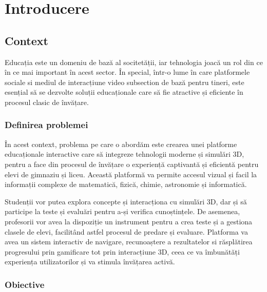 \chapter{Introducere}
\label{chapter:intro}


\section{Context}
\label{sec:proj}
\onehalfspacing
Educația este un domeniu de bază al socitetății, iar tehnologia joacă un rol din ce în ce mai important 
în acest sector. În special, într-o lume în care platformele sociale si mediul de interacțiune video subsection
de bază pentru tineri, este esențial să se dezvolte soluții educaționale care să fie atractive și eficiente în 
procesul clasic de învățare.

\subsection{Definirea problemei}
\label{sub-sec:proj-scope}
\onehalfspacing
În acest context, problema pe care o abordăm este crearea unei platforme educaționale interactive care să integreze
tehnologii moderne și simulări 3D, pentru a face din procesul de învățare o experiență captivantă și eficientă pentru
elevi de gimnaziu și liceu. Această platformă va permite accesul vizual și facil la informații complexe de matematică,
fizică, chimie, astronomie și informatică.

Studenții vor putea explora concepte și interacționa cu simulări 3D, dar și să participe la teste și evaluări
pentru a-și verifica cunoștințele. De asemenea, profesorii vor avea la dispoziție un instrument pentru a crea teste și
a gestiona clasele de elevi, facilitând astfel procesul de predare și evaluare. Platforma va avea un sistem interactiv de 
navigare, recunoaștere a rezultatelor si răsplătirea progresului prin gamificare tot prin interacțiune 3D, ceea ce va
îmbunătăți experiența utilizatorilor și va stimula învățarea activă.


\subsection{Obiective}
\label{sub-sec:proj-objectives}

